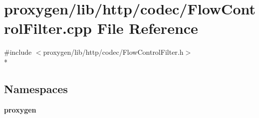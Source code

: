 \section{proxygen/lib/http/codec/\+Flow\+Control\+Filter.cpp File Reference}
\label{FlowControlFilter_8cpp}
{\ttfamily \#include $<$proxygen/lib/http/codec/\+Flow\+Control\+Filter.\+h$>$}\\*
\subsection*{Namespaces}
\begin{DoxyCompactItemize}
\item 
 {\bf proxygen}
\end{DoxyCompactItemize}
